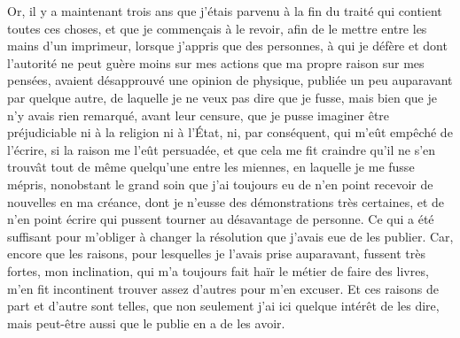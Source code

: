 \documentclass[french,twoside]{book} %
\newcommand\chaptercont{} %
\begin{document}
\chaptercont
\noindent Or, il y a maintenant trois ans que j'étais parvenu à la fin du traité qui contient toutes ces choses, et que je commençais à le revoir, afin de le mettre entre les mains d'un imprimeur, lorsque j'appris que des personnes, à qui je défère et dont l'autorité ne peut guère moins sur mes actions que ma propre raison sur mes pensées, avaient désapprouvé une opinion de physique, publiée un peu auparavant par quelque autre, de laquelle je ne veux pas dire que je fusse, mais bien que je n'y avais rien remarqué, avant leur censure, que je pusse imaginer être préjudiciable ni à la religion ni à l'État, ni, par conséquent, qui m'eût empêché de l'écrire, si la raison me l'eût persuadée, et que cela me fit craindre qu'il ne s'en trouvât tout de même quelqu'une entre les miennes, en laquelle je me fusse mépris, nonobstant le grand soin que j'ai toujours eu de n'en point recevoir de nouvelles en ma créance, dont je n'eusse des démonstrations très certaines, et de n'en point écrire qui pussent tourner au désavantage de personne. Ce qui a été suffisant pour m'obliger à changer la résolution que j'avais eue de les publier. Car, encore que les raisons, pour lesquelles je l'avais prise auparavant, fussent très fortes, mon inclination, qui m'a toujours fait haïr le métier de faire des livres, m'en fit incontinent trouver assez d'autres pour m'en excuser. Et ces raisons de part et d'autre sont telles, que non seulement j'ai ici quelque intérêt de les dire, mais peut-être aussi que le publie en a de les avoir.\par
\end{document}
